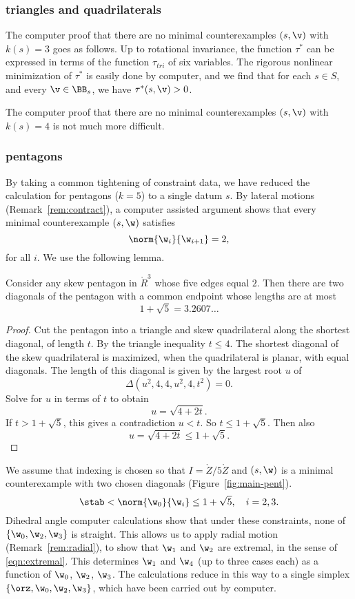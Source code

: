 \subsubsection{triangles and quadrilaterals}

The computer proof that there are no minimal counterexamples $(s,\v)$
with $k(s)=3$ goes as follows.  Up to rotational invariance, the function
$\tau^*$ can be expressed in terms of the function $\tau_{tri}$ of six
variables.  The rigorous nonlinear minimization of $\tau^*$ is easily done
by computer, and we find that for each $s\in S$, and every $\v\in \BB_s$,
we have $\tau^*(s,\v)>0$.

The computer proof that there are no minimal counterexamples $(s,\v)$
with $k(s)=4$ is not much more difficult.

\subsubsection{pentagons}

By taking a common tightening of constraint data, we have reduced the
calculation for pentagons ($k=5$) to a single datum $s$.   
By lateral motions  (Remark~\ref{rem:contract}), 
a computer assisted argument shows that every minimal
counterexample $(s,\w)$ satisfies
\[
\norm{\w_i}{\w_{i+1}} = 2,
\]
for all $i$.  We use the following lemma.

\begin{lemma}
Consider any skew pentagon in $\ring{R}^3$ whose five edges equal $2$.
Then there are two  diagonals  of the pentagon with a common
endpoint whose lengths  are at most
\[
1 + \sqrt{5} = 3.2607\ldots
\]
\end{lemma}

\begin{proof}
  Cut the pentagon into a triangle and skew quadrilateral along the
  shortest diagonal, of length $t$.  By the triangle inequality
  $t\le4$.  The shortest diagonal of the skew quadrilateral is
  maximized, when the quadrilateral is planar, with equal diagonals.
  The length of this diagonal is given by the largest root $u$ of
\[
\Delta(u^2,4,4,u^2,4,t^2)=0.
\]
Solve for $u$ in terms of $t$ to obtain
\[
u = \sqrt{4 + 2 t}.
\]
If $t>1+\sqrt{5}$, this gives a contradiction $u<t$.  
So $t\le 1+\sqrt{5}$.
Then also
\[
u = \sqrt{4 + 2t} \le 1+\sqrt{5}.
\]
\end{proof}

\figLZBQINL %


We assume that indexing is chosen so that $I=\ring{Z}/5\ring{Z}$ and
 $(s,\w)$ is a minimal
counterexample with two chosen diagonals (Figure~\ref{fig:main-pent}).
\[
\stab < \norm{\w_0}{\w_i} \le 1+\sqrt{5},\quad i=2,3.
\]
Dihedral angle computer calculations show that under these
constraints, none of $\{\w_0,\w_2,\w_3\}$ is straight.  This allows
us to apply radial motion (Remark~\ref{rem:radial}), to show that
$\w_1$ and $\w_2$ are extremal, in the sense of \eqref{eqn:extremal}.
This determines $\w_1$ and $\w_4$ (up to three cases each) as a
function of $\w_0$, $\w_2$, $\w_3$.  The calculations reduce in this
way to a single simplex $\{\orz,\w_0,\w_2,\w_3\}$, which have been
carried out by computer.

